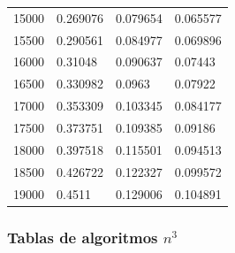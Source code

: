 \documentclass[a4paper, 11pt]{article}
\begin{document}
\begin{tabular}{@{}llll@{}}
15000         & 0.269076 & 0.079654  & 0.065577   \\
15500         & 0.290561 & 0.084977  & 0.069896   \\
16000         & 0.31048  & 0.090637  & 0.07443    \\
16500         & 0.330982 & 0.0963    & 0.07922    \\
17000         & 0.353309 & 0.103345  & 0.084177   \\
17500         & 0.373751 & 0.109385  & 0.09186    \\
18000         & 0.397518 & 0.115501  & 0.094513   \\
18500         & 0.426722 & 0.122327  & 0.099572   \\
19000         & 0.4511   & 0.129006  & 0.104891   \\
\bottomrule
\end{tabular}

\subsubsection{Tablas de algoritmos $n^3$}
\end{document}
